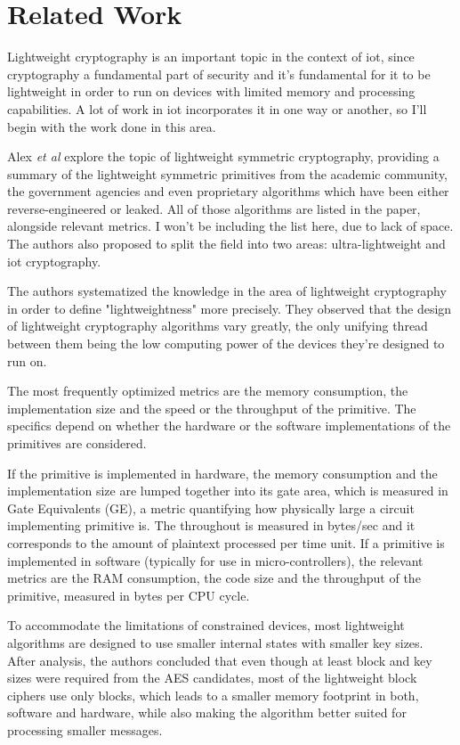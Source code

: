 \documentclass{llncs}
\begin{document}
\section{Related Work}

Lightweight cryptography is an important topic in the context of \gls{iot}, since
cryptography a fundamental part of security and it's fundamental for it to be
lightweight in order to run on devices with limited memory and processing
capabilities. A lot of work in \gls{iot} incorporates it in one way or another,
so I'll begin with the work done in this area.

Alex \textit{et al}\cite{Stateoft96:online} explore the topic of lightweight symmetric cryptography,
providing a summary of the lightweight symmetric
primitives from the academic community, the government agencies and even proprietary
algorithms which have been either reverse-engineered or leaked. All of those algorithms
are listed in the paper, alongside relevant metrics. I won't be including the list
here, due to lack of space. The authors also proposed
to split the field into two areas: ultra-lightweight and \gls{iot} cryptography.

The authors systematized the knowledge in the area of lightweight cryptography
in order to define "lightweightness" more precisely. They observed that the design
of lightweight cryptography algorithms vary greatly, the only unifying thread
between them being the low computing power of the devices they're designed to run on.

The most frequently optimized metrics are the memory consumption, the implementation size
and the speed or the throughput of the primitive. The specifics depend on whether
the hardware or the software implementations of the primitives are considered.

If the primitive is implemented in hardware, the memory consumption and the implementation
size are lumped together into its gate area, which is measured in Gate Equivalents (GE),
a metric quantifying how physically large a circuit implementing primitive is.
The throughout is measured in bytes/sec and it corresponds to the amount of plaintext
processed per time unit. If a primitive is implemented in software (typically for
use in micro-controllers), the relevant metrics are the RAM consumption, the code
size and the throughput of the primitive, measured in bytes per CPU cycle.

To accommodate the limitations of constrained devices, most lightweight algorithms
are designed to use smaller internal states with smaller key sizes. After analysis,
the authors concluded that even though at least  block and
key sizes were required from the AES candidates, most of the lightweight
block ciphers use only  blocks, which leads to a smaller memory
footprint in both, software and hardware, while also making the algorithm better suited
for processing smaller messages.
\end{document}
